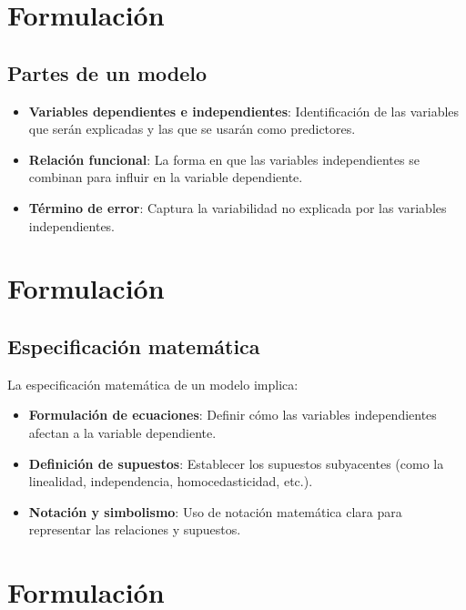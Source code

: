 \documentclass[
  letterpaper,
  DIV=11,
  numbers=noendperiod]{scrreprt}
\providecommand{\tightlist}{%
  \setlength{\itemsep}{0pt}\setlength{\parskip}{0pt}}\usepackage{longtable,booktabs,array}
\begin{document}
\section{Formulación}\label{formulaciuxf3n}

\subsection{Partes de un modelo}\label{partes-de-un-modelo}

\begin{itemize}
\tightlist
\item
  \textbf{Variables dependientes e independientes}: Identificación de
  las variables que serán explicadas y las que se usarán como
  predictores.
\item
  \textbf{Relación funcional}: La forma en que las variables
  independientes se combinan para influir en la variable dependiente.
\item
  \textbf{Término de error}: Captura la variabilidad no explicada por
  las variables independientes.
\end{itemize}

\section{Formulación}\label{formulaciuxf3n-1}

\subsection{Especificación
matemática}\label{especificaciuxf3n-matemuxe1tica}

La especificación matemática de un modelo implica:

\begin{itemize}
\tightlist
\item
  \textbf{Formulación de ecuaciones}: Definir cómo las variables
  independientes afectan a la variable dependiente.
\item
  \textbf{Definición de supuestos}: Establecer los supuestos subyacentes
  (como la linealidad, independencia, homocedasticidad, etc.).
\item
  \textbf{Notación y simbolismo}: Uso de notación matemática clara para
  representar las relaciones y supuestos.
\end{itemize}

\section{Formulación}\label{formulaciuxf3n-2}
\end{document}
